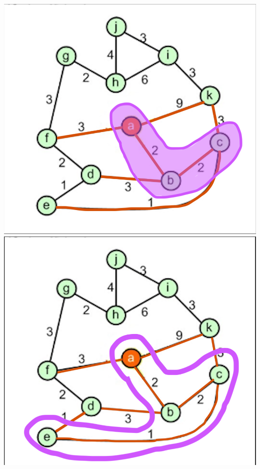 \documentclass[a4paper]{exam}
\begin{document}
\begin{questions}
\begin{parts}
\begin{solution}
    \includegraphics[scale=0.2]{Q3/images3b/3b3}
    \includegraphics[scale=0.2]{Q3/images3b/3b4}

\end{solution}
\end{parts}
\end{questions}
\end{document}
